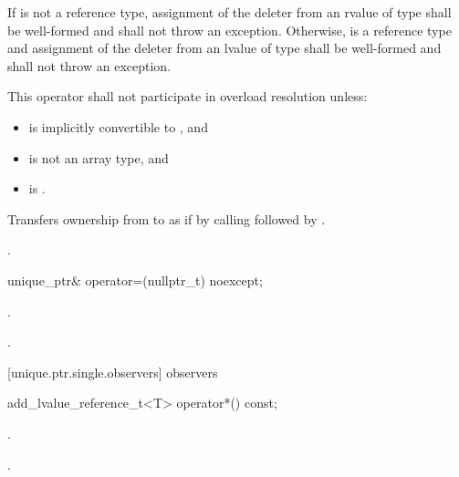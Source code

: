 \begin{itemdescr}
\pnum
\requires If  is not a reference type, assignment of the deleter from
an rvalue of type  shall be well-formed and shall not throw an exception.
Otherwise,  is a reference type and assignment of the deleter from an lvalue
of type  shall be well-formed and shall not throw an exception.

\pnum
\remarks This operator shall not participate in overload resolution unless:

\begin{itemize}
\item {} is implicitly convertible to , and
\item {} is not an array type, and
\item {} is .
\end{itemize}

\pnum
\effects Transfers ownership from  to  as if by calling
 followed by
.

\pnum
\returns {}.
\end{itemdescr}

\begin{itemdecl}
unique_ptr& operator=(nullptr_t) noexcept;
\end{itemdecl}

\begin{itemdescr}
\pnum
\effects {}.

\pnum
\postcondition {}

\pnum
\returns {}.
\end{itemdescr}

[unique.ptr.single.observers]{ observers}

\begin{itemdecl}
add_lvalue_reference_t<T> operator*() const;
\end{itemdecl}

\begin{itemdescr}
\pnum
\requires {}.

\pnum
\returns {}.

\end{itemdescr}

